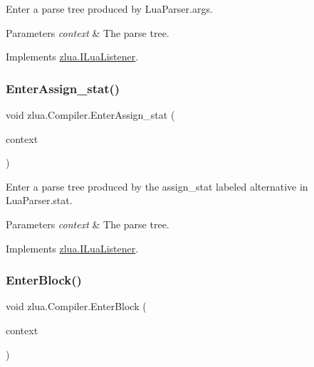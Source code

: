 Enter a parse tree produced by Lua\+Parser.\+args. 


\begin{DoxyParams}{Parameters}
{\em context} & The parse tree.\\
\hline
\end{DoxyParams}


Implements \mbox{\hyperlink{interfacezlua_1_1_i_lua_listener_a77a4130828fbc6f3827ea87c567e84ac}{zlua.\+I\+Lua\+Listener}}.

\mbox{\label{classzlua_1_1_compiler_aaffd1a513f64fae2076a896a889e00bf}} 
\subsubsection{\texorpdfstring{Enter\+Assign\+\_\+stat()}{EnterAssign\_stat()}}
{\footnotesize\ttfamily void zlua.\+Compiler.\+Enter\+Assign\+\_\+stat (\begin{DoxyParamCaption}\item[{\mbox{[}\+Not\+Null\mbox{]} \mbox{\hyperlink{classzlua_1_1_lua_parser_1_1_assign__stat_context}{Lua\+Parser.\+Assign\+\_\+stat\+Context}}}]{context }\end{DoxyParamCaption})}



Enter a parse tree produced by the {\ttfamily assign\+\_\+stat} labeled alternative in Lua\+Parser.\+stat. 


\begin{DoxyParams}{Parameters}
{\em context} & The parse tree.\\
\hline
\end{DoxyParams}


Implements \mbox{\hyperlink{interfacezlua_1_1_i_lua_listener_a6c89bd1b72debe5db0a3bd633af3c6c9}{zlua.\+I\+Lua\+Listener}}.

\mbox{\label{classzlua_1_1_compiler_a3bb0ad1158b35844611b3bbb75ff5521}} 
\subsubsection{\texorpdfstring{Enter\+Block()}{EnterBlock()}}
{\footnotesize\ttfamily void zlua.\+Compiler.\+Enter\+Block (\begin{DoxyParamCaption}\item[{\mbox{[}\+Not\+Null\mbox{]} \mbox{\hyperlink{classzlua_1_1_lua_parser_1_1_block_context}{Lua\+Parser.\+Block\+Context}}}]{context }\end{DoxyParamCaption})}



